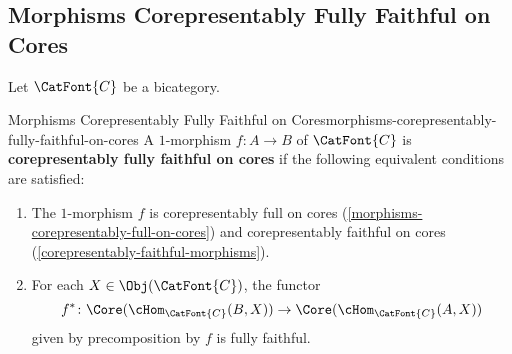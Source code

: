 \subsection{Morphisms Corepresentably Fully Faithful on Cores}\label{subsection-morphisms-corepresentably-fully-faithful-on-cores}
Let $\CatFont{C}$ be a bicategory.
\begin{definition}{Morphisms Corepresentably Fully Faithful on Cores}{morphisms-corepresentably-fully-faithful-on-cores}%
    A $1$-morphism $f\colon A\to B$ of $\CatFont{C}$ is \textbf{corepresentably fully faithful on cores} if the following equivalent conditions are satisfied:
    \begin{enumerate}
        \item\label{morphisms-corepresentably-fully-faithful-on-cores-1}The $1$-morphism $f$ is corepresentably full on cores (\cref{morphisms-corepresentably-full-on-cores}) and corepresentably faithful on cores (\cref{corepresentably-faithful-morphisms}).
        \item\label{morphisms-corepresentably-fully-faithful-on-cores-2}For each $X\in\Obj(\CatFont{C})$, the functor
            \[
                f^{*}%
                \colon%
                \Core(\cHom_{\CatFont{C}}(B,X))%
                \to%
                \Core(\cHom_{\CatFont{C}}(A,X))%
            \]%
            given by precomposition by $f$ is fully faithful.
    \end{enumerate}
\end{definition}
